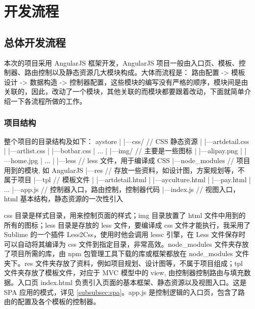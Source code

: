 \documentclass[UTF8]{ctexbook}
\begin{document}
  \chapter{开发流程}
    \label{chap:开发流程}

  \section{总体开发流程}
    \label{sec:总体开发流程}
      本次的项目采用 AngularJS 框架开发，AngularJS 项目一般由入口页、模板、控制器、路由控制以及静态资源几大模块构成。大体而流程是： 路由配置 -> 模板设计 -> 数据构造 -> 控制器配置，这些模块的编写没有严格的顺序，模块间是由关联的，因此，改动了一个模块，其他关联的而模块都要跟着改动，下面就简单介绍一下各流程所做的工作。

    \subsection{项目结构}
      \label{subsec:项目结构}
        整个项目的目录结构及如下：
                         aystore
                          |
                          |---css/ // CSS 静态资源
                          |    |---artdetail.css
                          |    |---artlist.css
                          |    |---botbar.css
                          |    ...
                          |
                          |---img/ // 主要是一些图标
                          |    |---alipay.png
                          |    |---home.jpg
                          |    ...
                          |
                          |---less // less 文件，用于编译成 CSS
                          |---node_modules // 项目用到的模块, 如 AngularJS
                          |---res // 存放一些资料，如设计图，方案规划等，不属于项目
                          |---tpl // 模板文件
                          |    |---artdetail.html
                          |    |---ayculture.html
                          |    |---pay.html
                          |    ...
                          |---app.js   // 控制器入口，路由控制，控制器代码
                          |---index.js // 视图入口，html 基本结构，静态资源的一次性引入
        \par
        css 目录是样式目录，用来控制页面的样式；img 目录放置了 html 文件中用到的所有的图标；less 目录是存放的 less 文件，要编译成 css 文件才能执行，我采用了 Sublime 的一个插件 Less2Css，使用时他会调用 lessc 引擎，在 Less 文件保存时可以自动将其编译为 css 文件到指定目录，非常高效。node_modules 文件夹存放了项目所需的库，由 npm 包管理工具下载的库或框架都放在 node_modules 文件夹下。res 文件夹存放了资料，例如项目规划、设计图等，不属于项目组成；tpl 文件夹存放了模板文件，对应于 MVC 模型中的 view, 由控制器控制路由与填充数据。入口页 index.html 负责引入页面的基本框架、静态资源以及视图入口。这是 SPA 应用的模式，详见 \ref{subsubsec:spa}。app.js 是控制逻辑的入口页，包含了路由的配置及各个模板的控制器。
\end{document}
